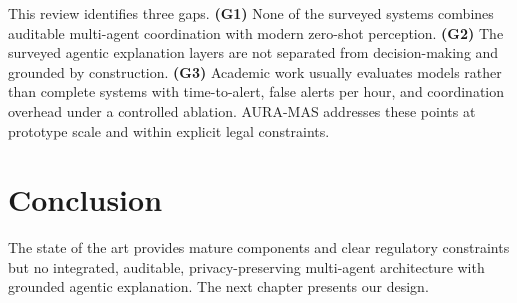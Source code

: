 This review identifies three gaps. \textbf{(G1)} None of the surveyed systems combines auditable multi-agent coordination with modern zero-shot perception. \textbf{(G2)} The surveyed agentic explanation layers are not separated from decision-making and grounded by construction. \textbf{(G3)} Academic work usually evaluates models rather than complete systems with time-to-alert, false alerts per hour, and coordination overhead under a controlled ablation. AURA-MAS addresses these points at prototype scale and within explicit legal constraints.

\section{Conclusion}

The state of the art provides mature components and clear regulatory constraints but no integrated, auditable, privacy-preserving multi-agent architecture with grounded agentic explanation. The next chapter presents our design.
